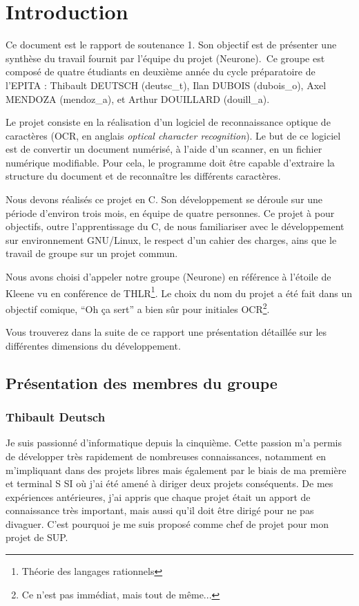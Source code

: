 \documentclass[11pt]{report}
\begin{document}
\newpage
{}
\tableofcontents

\chapter{Introduction}

Ce document est le rapport de soutenance 1. Son objectif est de présenter une synthèse du travail fournit par l’équipe du projet (Neurone)\up{*}.\ Ce groupe est composé de quatre étudiants en deuxième année du cycle préparatoire de l’EPITA : Thibault DEUTSCH (deutsc\_t), Ilan DUBOIS (dubois\_o),  Axel MENDOZA (mendoz\_a), et Arthur DOUILLARD (douill\_a).

Le projet consiste en la réalisation d’un logiciel de reconnaissance optique de caractères (OCR, en anglais \emph{optical character recognition}). Le but de ce logiciel est de convertir un document numérisé, à l'aide d'un scanner, en un fichier numérique modifiable. Pour cela, le programme doit être capable d'extraire la structure du document et de reconnaître les différents caractères.

Nous devons réalisés ce projet en C. Son développement se déroule sur une période d’environ trois mois, en équipe de quatre personnes. Ce projet à pour objectifs, outre l'apprentissage du C, de nous familiariser avec le développement sur environnement GNU/Linux, le respect d'un cahier des charges, ains que le travail de groupe sur un projet commun.

Nous avons choisi d’appeler notre groupe (Neurone)\up{*} en référence à l’étoile de Kleene vu en conférence de THLR\footnote{Théorie des langages rationnels}. Le choix du nom du projet a été fait dans un objectif comique, ``Oh ça sert'' a bien sûr pour initiales OCR\footnote{Ce n'est pas immédiat, mais tout de même...}.

Vous trouverez dans la suite de ce rapport une présentation détaillée sur les différentes dimensions du développement.

\newpage
\section{Présentation des membres du groupe}

\subsection{Thibault Deutsch}

Je suis passionné d’informatique depuis la cinquième. Cette passion m’a permis de développer très rapidement de nombreuses connaissances, notamment en m’impliquant dans des projets libres mais également par le biais de ma première et terminal S SI où j’ai été amené à diriger deux projets conséquents. De mes expériences antérieures, j’ai appris que chaque projet était un apport de connaissance très important, mais aussi qu’il doit être dirigé pour ne pas divaguer. C’est pourquoi je me suis proposé comme chef de projet pour mon projet de SUP.
\end{document}

